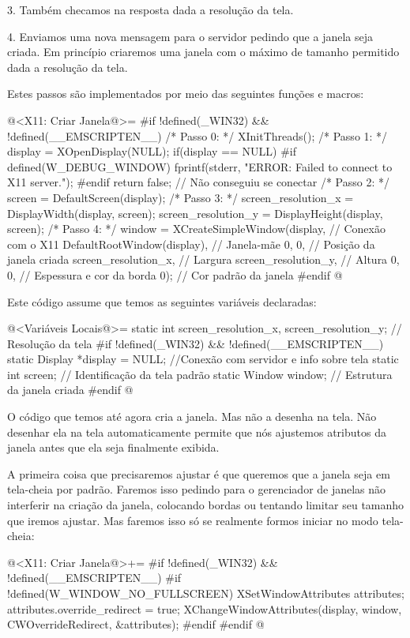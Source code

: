 3. Também checamos na resposta dada a resolução da tela.

4. Enviamos uma nova mensagem para o servidor pedindo que a janela
seja criada. Em princípio criaremos uma janela com o máximo de tamanho
permitido dada a resolução da tela.

Estes passos são implementados por meio das seguintes funções e
macros:

\iniciocodigo
@<X11: Criar Janela@>=
#if !defined(_WIN32) && !defined(__EMSCRIPTEN__)
/* Passo 0: */
XInitThreads();
/* Passo 1: */
display = XOpenDisplay(NULL);
if(display == NULL){
#if defined(W_DEBUG_WINDOW)
  fprintf(stderr, "ERROR: Failed to connect to X11 server.\n");
#endif
  return false; // Não conseguiu se conectar
}
/* Passo 2: */
screen = DefaultScreen(display);
/* Passo 3: */
screen_resolution_x = DisplayWidth(display, screen);
screen_resolution_y = DisplayHeight(display, screen);
/* Passo 4: */
window = XCreateSimpleWindow(display, // Conexão com o X11
                             DefaultRootWindow(display), // Janela-mãe
                             0, 0, // Posição da janela criada
                             screen_resolution_x, // Largura
                             screen_resolution_y, // Altura
                             0, 0, // Espessura e cor da borda
                             0); // Cor padrão da janela
#endif
@
\fimcodigo

Este código assume que temos as seguintes variáveis declaradas:

\iniciocodigo
@<Variáveis Locais@>=
static int screen_resolution_x, screen_resolution_y; // Resolução da tela
#if !defined(_WIN32) && !defined(__EMSCRIPTEN__)
static Display *display = NULL; //Conexão com servidor e info sobre tela
static int screen;       // Identificação da tela padrão
static Window window;    // Estrutura da janela criada
#endif
@
\fimcodigo

O código que temos até agora cria a janela. Mas não a desenha na
tela. Não desenhar ela na tela automaticamente permite que nós
ajustemos atributos da janela antes que ela seja finalmente exibida.

A primeira coisa que precisaremos ajustar é que queremos que a janela
seja em tela-cheia por padrão. Faremos isso pedindo para o gerenciador
de janelas não interferir na criação da janela, colocando bordas ou
tentando limitar seu tamanho que iremos ajustar. Mas faremos isso só
se realmente formos iniciar no modo tela-cheia:

\iniciocodigo
@<X11: Criar Janela@>+=
#if !defined(_WIN32) && !defined(__EMSCRIPTEN__)
#if !defined(W_WINDOW_NO_FULLSCREEN)
{
  XSetWindowAttributes attributes;
  attributes.override_redirect = true;
  XChangeWindowAttributes(display, window, CWOverrideRedirect,
                          &attributes);
}
#endif
#endif
@
\fimcodigo

